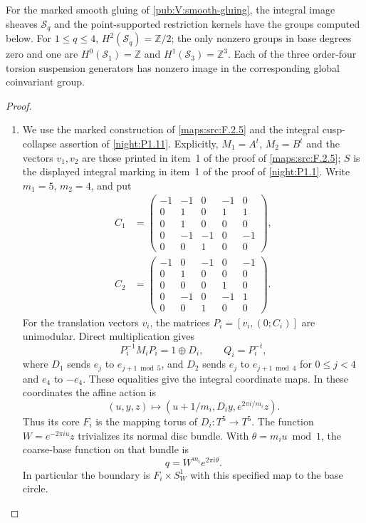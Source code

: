 \begin{lemma}
\hypertarget{tag-PV12}{}\label{pub:V:integral-restrictions}
For the marked smooth gluing of \cref{pub:V:smooth-gluing}, the
integral image sheaves $\mathcal S_q$ and the point-supported
restriction kernels have the groups computed below. For $1\le q\le4$,
$H^2(\mathcal S_q)=\mathbb Z/2$; the only nonzero groups in base
degrees zero and one are $H^0(\mathcal S_1)=\mathbb Z$ and
$H^1(\mathcal S_3)=\mathbb Z^3$. Each of the three order-four
torsion suspension generators has nonzero image in the corresponding
global coinvariant group.
\end{lemma}
\begin{proof}
\begin{enumerate}[label=\arabic*.,leftmargin=*]
\item We use the marked construction of \cref{maps:src:F.2.5} and the
integral cusp-collapse assertion of \cref{night:P1.11}.
Explicitly, $M_1=A^t$, $M_2=B^t$ and the vectors $v_1,v_2$ are
those printed in item~1 of the proof of \cref{maps:src:F.2.5};
$S$ is the displayed integral marking in item~1 of the proof of
\cref{night:P1.1}.  Write
$m_1=5$, $m_2=4$, and put
\[
\begin{split}
C_1&=\begin{pmatrix}
-1&-1&0&-1&0\\0&1&0&1&1\\0&1&0&0&0\\
0&-1&-1&0&-1\\0&0&1&0&0
\end{pmatrix},\\[2pt]
C_2&=\begin{pmatrix}
-1&0&-1&0&-1\\0&1&0&0&0\\0&0&0&1&0\\
0&-1&0&-1&1\\0&0&1&0&0
\end{pmatrix}.
\end{split}
\]
For the translation vectors $v_i$, the matrices
$P_i=[v_i,(0;C_i)]$ are unimodular.  Direct multiplication gives
\[
 P_i^{-1}M_iP_i=1\oplus D_i,\qquad Q_i=P_i^{-t},
\]
where $D_1$ sends $e_j$ to $e_{j+1\bmod5}$, and $D_2$ sends
$e_j$ to $e_{j+1\bmod4}$ for $0\le j<4$ and $e_4$ to $-e_4$.
These equalities give the integral coordinate maps.  In these
coordinates the affine action is
\[
 (u,y,z)\longmapsto
 (u+1/m_i,D_i y,e^{2\pi i/m_i}z).
\]
Thus its core $F_i$ is the mapping torus of $D_i:T^5\to T^5$.
The function $W=e^{-2\pi i u}z$ trivializes its normal disc bundle.
With $\theta=m_i u\bmod1$, the coarse-base function on that bundle is
\[
                  q=W^{m_i}e^{2\pi i\theta}.
\]
In particular the boundary is $F_i\times S^1_W$ with this specified
map to the base circle.


\end{enumerate}
\end{proof}
